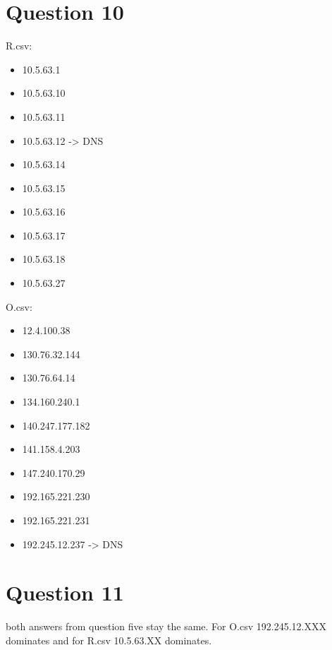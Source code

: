 \documentclass[letterpaper,12pt,titlepage,onecolumn]{IEEEtran}
\begin{document}
\section{Question 10}
R.csv:
\begin{itemize}
    \item 10.5.63.1 
    \item 10.5.63.10
    \item 10.5.63.11
    \item 10.5.63.12 -> DNS
    \item 10.5.63.14
    \item 10.5.63.15
    \item 10.5.63.16
    \item 10.5.63.17
    \item 10.5.63.18
    \item 10.5.63.27
\end{itemize}

O.csv:
\begin{itemize}
    \item 12.4.100.38
    \item 130.76.32.144
    \item 130.76.64.14
    \item 134.160.240.1
    \item 140.247.177.182
    \item 141.158.4.203
    \item 147.240.170.29
    \item 192.165.221.230
    \item 192.165.221.231 
    \item 192.245.12.237 -> DNS
\end{itemize}

\section{Question 11}
both answers from question five stay the same. For O.csv 192.245.12.XXX dominates and for R.csv 10.5.63.XX dominates.
\end{document}
